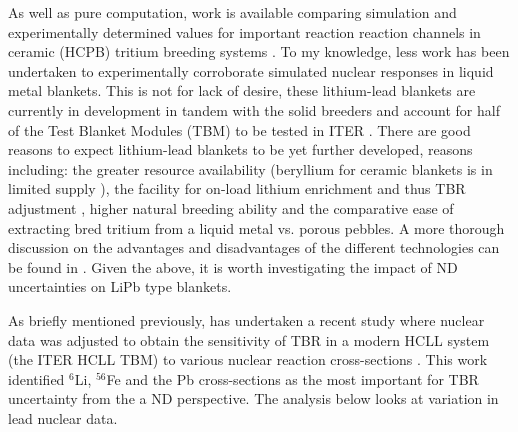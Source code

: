 As well as pure computation, work is available comparing simulation and experimentally determined values for important reaction reaction channels in ceramic (HCPB) tritium breeding systems \cite{Batistoni2007}. To my knowledge, less work has been undertaken to experimentally corroborate simulated nuclear responses in liquid metal blankets. This is not for lack of desire, these lithium-lead blankets are currently in development in tandem with the solid breeders and account for half of the Test Blanket Modules (TBM) to be tested in ITER \cite{Chuyanov2010}. There are good reasons to expect lithium-lead blankets to be yet further developed, reasons including: the greater resource availability (beryllium for ceramic blankets is in limited supply \cite{Bradshaw2011} \cite{Shimwell2014}), the facility for on-load lithium enrichment and thus TBR adjustment \cite{Ihli2008}, higher natural breeding ability \cite{Colling2012} and the comparative ease of extracting bred tritium from a liquid metal vs. porous pebbles. A more thorough discussion on the advantages and disadvantages of the different technologies can be found in \cite{Abdou2015}. Given the above, it is worth investigating the impact of ND uncertainties on LiPb type blankets.



As briefly mentioned previously, \citeauthor{Leichtle2011} has undertaken a recent study where nuclear data was adjusted to obtain the sensitivity of TBR in a modern HCLL system (the ITER HCLL TBM) to various nuclear reaction cross-sections \cite{Leichtle2011}. This work identified $^{6}$Li, $^{56}$Fe and the Pb cross-sections as the most important for TBR uncertainty from the a ND perspective. The analysis below looks at variation in lead nuclear data. 

